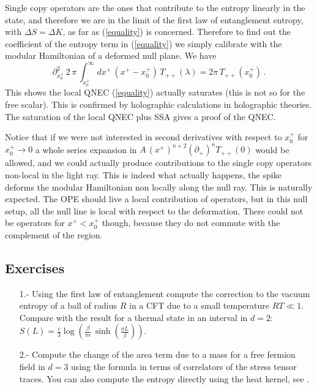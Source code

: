 \documentclass[11pt]{article}
\numberwithin{equation}{section}
\newcommand{\be}{\begin{equation}}
\newcommand{\ee}{\end{equation}}
\begin{document}
Single copy operators are the ones that contribute to the entropy linearly in the state, and therefore we are in the limit of the first law of entanglement entropy, with $\Delta S=\Delta K$, as far as (\ref{equality}) is concerned. Therefore to find out the coefficient of the entropy term in (\ref{equality}) we simply calibrate with the modular Hamiltonian of a deformed null plane. We have
\be
\partial_{x_0^+}^2 \,2 \,\pi\,\int_{x_0^+}^\infty dx^+\, (x^+-x_0^+)\,T_{++}(\lambda)=2 \pi \, T_{++}(x_0^+)\,.
\ee
This shows the local QNEC (\ref{equality}) actually saturates (this is not so for the free scalar). 
This is confirmed by holographic calculations in holographic theories. The saturation of the local QNEC plus SSA gives a proof of the QNEC. 

Notice that if we were not interested in second derivatives with respect to $x^+_0$ for $x_0^+\rightarrow 0$ a whole series expansion in $A \,(x^+)^{n+2} (\partial_+)^n T_{++}(0)$ would be allowed, and we could actually produce contributions to the single copy operators non-local in the light ray. This is indeed what actually happens, the spike deforms the modular Hamiltonian non locally along the null ray. This is naturally expected. The OPE should live a local contribution of operators, but in this null setup, all the null line is local with respect to the deformation. There could not be operators for $x^+< x^+_0$ though, because they do not commute with the complement of the region.        

\subsection{Exercises}

\begin{itemize}

\item[1.-] Using the first law of entanglement compute the correction to the vacuum entropy of a ball of radius $R$ in a CFT due to a small temperature $R T\ll 1$. Compare with the result for a thermal state in an interval in $d=2$: $S(L)=\frac{c}{3} \log\left(\frac{\beta}{\pi\epsilon}\,\sinh\left(\frac{\pi L}{\beta}\right)\right)$.

\item[2.-] Compute the change of the area term due to a mass for a free fermion field in $d=3$ using the formula in terms of correlators of the stress tensor traces. You can also compute the entropy directly using the heat kernel, see \cite{Hertzberg:2010uv}. 

\end{itemize}
\end{document}
